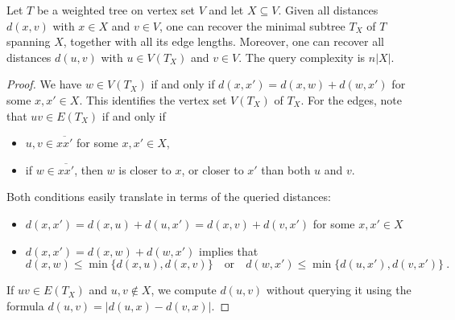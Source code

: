 \documentclass[10pt,a4paper]{amsart}
\begin{document}
\begin{lemma}\label{lem:TX}
Let $T$ be a weighted tree on vertex set $V$ and let $X\subseteq V$. Given all distances $d(x,v)$ with $x\in X$ and $v\in V$, one can recover the minimal subtree $T_X$ of $T$ spanning $X$, together with all its edge lengths. Moreover, one can recover all distances $d(u,v)$ with $u\in V(T_X)$ and $v\in V$. The query complexity is $n|X|$.
\end{lemma}

 \begin{proof}
     We have $w\in V(T_X)$ if and only if $d(x,x')=d(x,w)+d(w,x')$ for some $x,x'\in X$. This identifies the vertex set $V(T_X)$ of $T_X$. For the edges, note that $uv\in E(T_X)$ if and only if 
     \begin{itemize}
         \item [(i)] $u,v\in \overline{xx'}$ for some $x,x'\in X$,
         \item [(ii)] if $w\in \overline{xx'}$, then $w$ is closer to $x$, or closer to $x'$ than both $u$ and $v$.
     \end{itemize}
     Both conditions easily translate in terms of the queried distances:
     \begin{itemize}
         \item [(i)] $d(x,x')=d(x,u)+d(u,x')=d(x,v)+d(v,x')$ for some $x,x'\in X$
         \item [(ii)] $d(x,x')=d(x,w)+d(w,x')$ implies that 
         $$d(x,w)\leq \min\{d(x,u),d(x,v)\} \quad \text{or} \quad d(w,x')\leq \min\{d(u,x'),d(v,x')\}~.$$
     \end{itemize}
     If $uv\in E(T_X)$ and $u,v\notin X$, we compute $d(u,v)$ without querying it using the formula $d(u,v)=|d(u,x)-d(v,x)|$. 


\end{proof}
\end{document}
